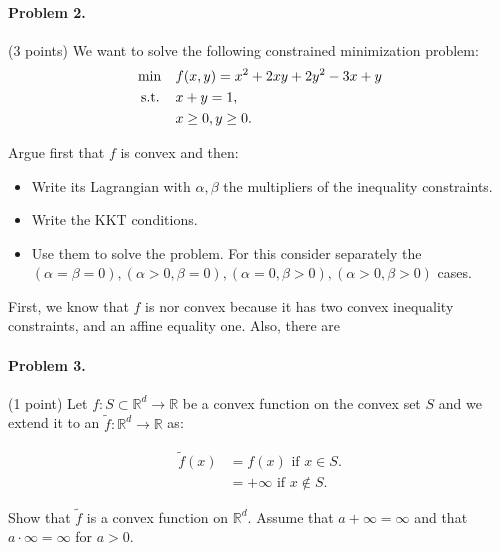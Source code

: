 \documentclass[12pt]{scrartcl}
\begin{document}
\begin{boxF}
\paragraph*{Problem 2.} (3 points) \hspace{0.15em} We want to solve the following constrained minimization problem: 
    \begin{align*}
        \mbox{min   \hspace{0.7em}}  & f(x, y) = x^2 + 2xy + 2y^2 - 3x + y \\
        \mbox{s.t.  \hspace{0.7em}} & x + y = 1, \\
        & x \geq 0, y \geq 0.
    \end{align*}
    
Argue first that $f$ is convex and then:

\begin{itemize}
    \item Write its Lagrangian with $\alpha, \beta$ the multipliers of the inequality constraints.
    \item Write the KKT conditions.
    \item Use them to solve the problem. For this consider separately the $(\alpha = \beta = 0), (\alpha > 0, \beta = 0), (\alpha = 0, \beta > 0), (\alpha > 0, \beta > 0)$ cases.
\end{itemize}

First, we know that $f$ is nor convex because it has two convex inequality constraints, and an affine equality one. Also, there are 

\end{boxF}






\begin{boxF}
\paragraph*{Problem 3.} (1 point) \hspace{0.15em} Let $f : S \subset \mathbb{R}^d \to \mathbb{R}$ be a convex function on the convex set $S$ and we extend it to an $\tilde f : \mathbb{R}^d \to \mathbb{R}$ as:

    \begin{align*}
        \tilde f(x) &= f(x) \mbox{ if } x \in S. \\
                    &= +\infty \mbox{ if } x \notin S.
    \end{align*}

Show that $\tilde f$ is a convex function on $\mathbb{R}^d$. Assume that $a + \infty = \infty $ and that $ a \cdot \infty = \infty$ for $a > 0$.
\end{boxF}
\end{document}
